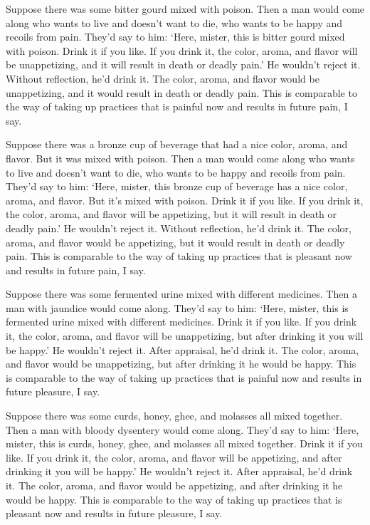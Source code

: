 \documentclass[12pt,openany]{book}%
\begin{document}
Suppose there was some bitter gourd mixed with poison. Then a man would come along who wants to live and doesn’t want to die, who wants to be happy and recoils from pain. They’d say to him: ‘Here, mister, this is bitter gourd mixed with poison. Drink it if you like. If you drink it, the color, aroma, and flavor will be unappetizing, and it will result in death or deadly pain.’ He wouldn’t reject it. Without reflection, he’d drink it. The color, aroma, and flavor would be unappetizing, and it would result in death or deadly pain. This is comparable to the way of taking up practices that is painful now and results in future pain, I say. 

Suppose there was a bronze cup of beverage that had a nice color, aroma, and flavor. But it was mixed with poison. Then a man would come along who wants to live and doesn’t want to die, who wants to be happy and recoils from pain. They’d say to him: ‘Here, mister, this bronze cup of beverage has a nice color, aroma, and flavor. But it’s mixed with poison. Drink it if you like. If you drink it, the color, aroma, and flavor will be appetizing, but it will result in death or deadly pain.’ He wouldn’t reject it. Without reflection, he’d drink it. The color, aroma, and flavor would be appetizing, but it would result in death or deadly pain. This is comparable to the way of taking up practices that is pleasant now and results in future pain, I say. 

Suppose there was some fermented urine mixed with different medicines. Then a man with jaundice would come along. They’d say to him: ‘Here, mister, this is fermented urine mixed with different medicines. Drink it if you like. If you drink it, the color, aroma, and flavor will be unappetizing, but after drinking it you will be happy.’ He wouldn’t reject it. After appraisal, he’d drink it. The color, aroma, and flavor would be unappetizing, but after drinking it he would be happy. This is comparable to the way of taking up practices that is painful now and results in future pleasure, I say. 

Suppose there was some curds, honey, ghee, and molasses all mixed together. Then a man with bloody dysentery would come along. They’d say to him: ‘Here, mister, this is curds, honey, ghee, and molasses all mixed together. Drink it if you like. If you drink it, the color, aroma, and flavor will be appetizing, and after drinking it you will be happy.’ He wouldn’t reject it. After appraisal, he’d drink it. The color, aroma, and flavor would be appetizing, and after drinking it he would be happy. This is comparable to the way of taking up practices that is pleasant now and results in future pleasure, I say. 
\end{document}
